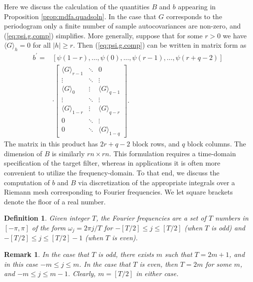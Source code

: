 \documentclass[a4paper]{book}
\newtheorem{Definition}{Definition}
\newtheorem{Remark}{Remark}
\begin{document}
 Here we discuss the calculation of the quantities $B$ and $b$ appearing in 
 Proposition \ref{prop:mdfa.quadsoln}.  In the case that $G$ corresponds to
 the periodogram  only a finite number of sample
 autocovariances are non-zero,  and (\ref{eq:psi.g.comp}) simplifies.
More generally, suppose that for some $r > 0$
 we have ${ \langle G \rangle }_h = 0$ for all $|h| \geq r$.  Then 
(\ref{eq:psi.g.comp}) can be written in matrix form as
\begin{align*}
 b^{\prime}  = & [ \psi (1-r), \ldots, \psi(0), \ldots, \psi (r-1), \ldots, \psi (r+q-2) ] \\
	& \cdot \left[ \begin{array}{ccc} { \langle G \rangle }_{r-1} & \ddots & 0 \\
		\vdots & \ddots & \vdots \\ { \langle G \rangle }_{0} & \vdots & 
	{ \langle G \rangle }_{q-1} \\ \vdots & \ddots & \vdots \\
	{ \langle G \rangle }_{1-r} & \vdots & { \langle G \rangle }_{q-r} \\
	0 & \ddots & \vdots \\ 0 & \ddots & { \langle G \rangle }_{1-q} \end{array} \right].
\end{align*}
 The matrix in this product has $2r+q-2$ block rows, and $q$ block columns.
 The dimension of $B$ is similarly $rn \times rn$.  This formulation requires
 a time-domain specification of the target filter, whereas in applications it is
 often more convenient to utilize the frequency-domain.  To that end, we discuss the 
 computation of $b$ and $B$ via discretization of the appropriate integrals over
 a Riemann mesh corresponding to Fourier frequencies.  We let square brackets
 denote the floor of a real number.


\begin{Definition} \rm
\label{def:fourier.freq}
 Given integer $T$, the Fourier frequencies are a set of $T$ numbers in $[-\pi,\pi]$
 of the form $\omega_{j} = 2 \pi j/ T $ for $-[T/2] \leq j \leq [T/2]$
 (when $T$ is odd) and $-[T/2] \leq j \leq [T/2]-1$ (when $T$ is even).
\end{Definition}

\begin{Remark} \rm
\label{rem:fourier.freq}
 In the case that $T$ is odd, there exists $m$ such that $T = 2 m + 1$, and in this
 case $-m \leq j \leq m$.  In the case that $T$ is even, then $T = 2m$ for some
 $m$, and $-m \leq j \leq m-1$.  Clearly, $m = [T/2]$ in either case.
\end{Remark}
\end{document}

